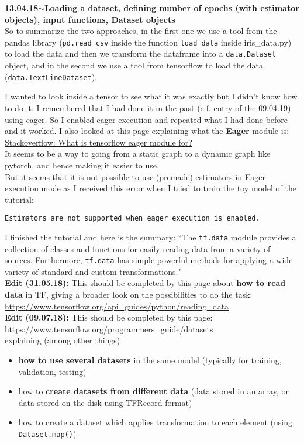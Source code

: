 \documentclass[11pt,a4paper]{article}
\newenvironment{loggentry}[2]%
{\noindent\textbf{#1}\hspace{1cm}$\mathbf{\sim}$\text{ }\textbf{#2}\\}{\vspace{0.5cm}}
\begin{document}
\begin{loggentry}{13.04.18}{Loading a dataset, defining number of epochs (with estimator objects), input functions, Dataset objects}
So to summarize the two approaches, in the first one we use a tool from the pandas library (\texttt{pd.read\_csv} inside the function \texttt{load\_data} inside iris\_data.py) to load the data and then we transform the dataframe into a \texttt{data.Dataset} object, and in the second we use a tool from tensorflow to load the data (\texttt{data.TextLineDataset}).

I wanted to look inside a tensor to see what it was exactly but I didn't know how to do it. I remembered that I had done it in the past (c.f. entry of the 09.04.19) using eager. So I enabled eager execution and repeated what I had done before and it worked. I also looked at this page explaining what the \textbf{Eager} module is:\\
\href{https://stackoverflow.com/questions/45967895/what-is-tensorflow-eager-module-for}{Stackoverflow: What is tensorflow eager module for?}\\
It seems to be a way to going from a static graph to a dynamic graph like pytorch, and hence making it easier to use.\\
But it seems that it is not possible to use (premade) estimators in Eager execution mode as I received this error when I tried to train the toy model of the tutorial:\\
\begin{verbatim}
Estimators are not supported when eager execution is enabled.
\end{verbatim}

I finished the tutorial and here is the summary: ``The \texttt{tf.data} module provides a collection of classes and functions for easily reading data from a variety of sources. Furthermore, \texttt{tf.data} has simple powerful methods for applying a wide variety of standard and custom transformations."\\
\textbf{Edit (31.05.18):} This should be completed by this page about \textbf{how to read data} in TF, giving a broader look on the possibilities to do the task:\\
\url{https://www.tensorflow.org/api_guides/python/reading_data}\\
\textbf{Edit (09.07.18):} This should be completed by this page:\\
\url{https://www.tensorflow.org/programmers_guide/datasets}\\
explaining (among other things) 
\begin{itemize}
\item \textbf{how to use several datasets} in the same model (typically for training, validation, testing)
\item how to \textbf{create datasets from different data} (data stored in an array, or data stored on the disk using TFRecord format)
\item how to create a dataset which applies transformation to each element (using \texttt{Dataset.map()})
\end{itemize}


\end{loggentry}
\end{document}
